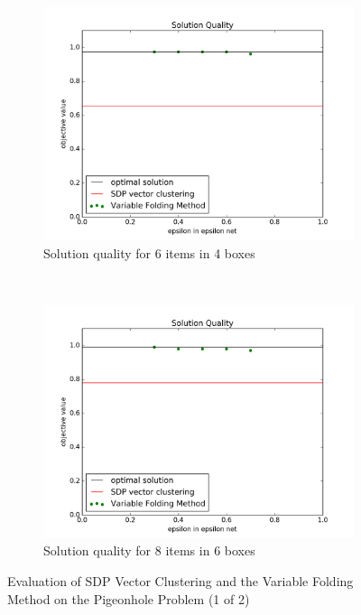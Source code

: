 \documentclass[12pt]{article} %
\begin{document}
\begin{figure}[htb]
	\begin{subfigure}[b]{0.45\textwidth}
	\centering
	\includegraphics[width=\textwidth]{solution_epsilon_n6m4}
	\caption{Solution quality for 6 items in 4 boxes}
	\label{n6m4}
	\end{subfigure}
	~
	\begin{subfigure}[b]{0.45\textwidth}
	\centering
	\includegraphics[width=\textwidth]{solution_epsilon_n8m6}
	\caption{Solution quality for 8 items in 6 boxes}
	\label{n8m6}
	\end{subfigure}
\caption{Evaluation of SDP Vector Clustering and the Variable Folding Method on the Pigeonhole Problem (1 of 2)}
\label{pigeon}
\end{figure}
\end{document}
